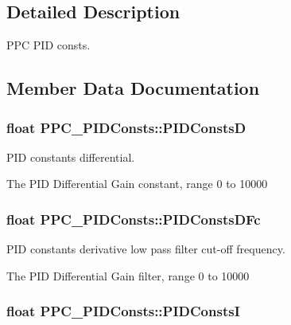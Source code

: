 \subsection{Detailed Description}
P\+PC P\+ID consts. 



\subsection{Member Data Documentation}
\subsubsection[{\texorpdfstring{P\+I\+D\+ConstsD}{PIDConstsD}}]{\setlength{\rightskip}{0pt plus 5cm}float P\+P\+C\+\_\+\+P\+I\+D\+Consts\+::\+P\+I\+D\+ConstsD}\hypertarget{struct_p_p_c___p_i_d_consts_ad7f11dc1aa9ff8cf4896582f40c511d9}{}\label{struct_p_p_c___p_i_d_consts_ad7f11dc1aa9ff8cf4896582f40c511d9}


P\+ID constants differential. 

The P\+ID Differential Gain constant, range 0 to 10000
\subsubsection[{\texorpdfstring{P\+I\+D\+Consts\+D\+Fc}{PIDConstsDFc}}]{\setlength{\rightskip}{0pt plus 5cm}float P\+P\+C\+\_\+\+P\+I\+D\+Consts\+::\+P\+I\+D\+Consts\+D\+Fc}\hypertarget{struct_p_p_c___p_i_d_consts_a33979ab0b95fb03f9c0571b8dea80218}{}\label{struct_p_p_c___p_i_d_consts_a33979ab0b95fb03f9c0571b8dea80218}


P\+ID constants derivative low pass filter cut-\/off frequency. 

The P\+ID Differential Gain filter, range 0 to 10000
\subsubsection[{\texorpdfstring{P\+I\+D\+ConstsI}{PIDConstsI}}]{\setlength{\rightskip}{0pt plus 5cm}float P\+P\+C\+\_\+\+P\+I\+D\+Consts\+::\+P\+I\+D\+ConstsI}\hypertarget{struct_p_p_c___p_i_d_consts_a1199abcba65cf5d00e46ed04136aa9e1}{}\label{struct_p_p_c___p_i_d_consts_a1199abcba65cf5d00e46ed04136aa9e1}


